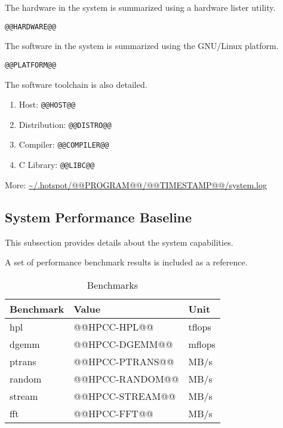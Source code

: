 \documentclass[a4paper]{article}
\begin{document}
The hardware in the system is summarized using a hardware lister utility.

\begin{verbatim}
@@HARDWARE@@
\end{verbatim}

The software in the system is summarized using the GNU/Linux platform.

\begin{verbatim}
@@PLATFORM@@
\end{verbatim}

The software toolchain is also detailed.

\begin{enumerate}
\item Host: {\tt @@HOST@@}
\item Distribution: {\tt @@DISTRO@@}
\item Compiler: {\tt @@COMPILER@@}
\item C Library: {\tt @@LIBC@@}
\end{enumerate}

More: \url{~/.hotspot/@@PROGRAM@@/@@TIMESTAMP@@/system.log}

\subsection{System Performance Baseline}

This subsection provides details about the system capabilities.

A set of performance benchmark results is included as a reference.

\begin{table}[H]
\caption{Benchmarks}
  \centering
    \begin{tabular}{|l|l|l|}\hline
      {\bf Benchmark} & {\bf Value} & {\bf Unit} \\ \hline
      hpl & @@HPCC-HPL@@ & tflops \\ \hline
      dgemm & @@HPCC-DGEMM@@ & mflops \\ \hline
      ptrans & @@HPCC-PTRANS@@ & MB/s \\ \hline
      random & @@HPCC-RANDOM@@ & MB/s \\ \hline
      stream & @@HPCC-STREAM@@ & MB/s \\ \hline
      fft & @@HPCC-FFT@@ & MB/s \\ \hline
    \end{tabular}
 \label{table:pruebas}
\end{table}
\end{document}

